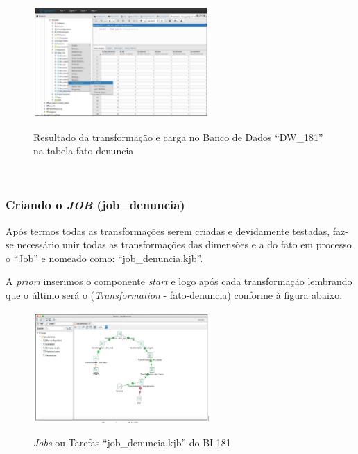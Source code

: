 \begin{figure}[H]
	\vspace*{0,2cm}
    \centering
    \caption{Resultado da transforma\c{c}\~{a}o e carga no Banco de Dados ``DW\_181'' na tabela fato-denuncia}
    \includegraphics[width=0.6\textwidth]{./04-figuras/figura-resultado-fato-denuncia}
    \label{fig:ilustfigresultadofatodenuncia}
\end{figure}
\vspace*{-0,9cm}
{\raggedright {}} \\

\subsubsection{Criando o \textit{JOB} (job\_denuncia)}

Ap\'os termos todas as transforma\c{c}\~{o}es serem criadas e devidamente testadas, faz-se necess\'{a}rio unir 
todas as transforma\c{c}\~{o}es das dimens\~{o}es e a do fato em processo o ``Job'' e nomeado como: ``job\_denuncia.kjb''. 

A \textit{priori} inserimos o componente \textit{start} e logo ap\'os cada transforma\c{c}\~{a}o lembrando que o último 
ser\'{a} o (\textit{Transformation} - fato-denuncia) conforme \`{a} figura abaixo.

\begin{figure}[H]
	\vspace*{0,2cm}
    \centering
    \caption{\textit{Jobs} ou Tarefas ``job\_denuncia.kjb'' do BI 181}
    \includegraphics[width=0.6\textwidth]{./04-figuras/figura-job}
    \label{fig:ilustfigjob}
\end{figure}
\vspace*{-0,9cm}
{\raggedright {}} \\

